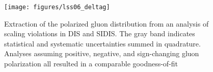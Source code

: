 \begin{figure}
  \centering
  \texttt{[image: figures/lss06\_deltag]}
  \caption{Extraction of the polarized gluon distribution from an analysis of
  scaling violations in DIS and SIDIS. The gray band indicates statistical and
  systematic uncertainties summed in quadrature. Analyses assuming positive,
  negative, and sign-changing gluon polarization all resulted in a comparable
  goodness-of-fit \cite{Leader:2006xc}}
  \label{fig:g1-deltag}
\end{figure}

